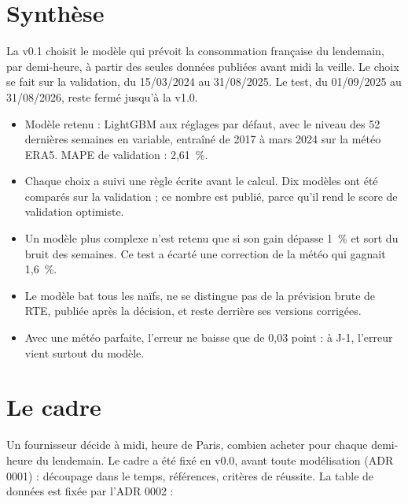 \documentclass[11pt,a4paper]{article}
\begin{document}

\setcounter{tocdepth}{1}
\tableofcontents
\newpage

\section*{Synthèse}

La v0.1 choisit le modèle qui prévoit la consommation française du lendemain, par demi-heure, à partir des seules données publiées avant midi la veille. Le choix se fait sur la validation, du 15/03/2024 au 31/08/2025. Le test, du 01/09/2025 au 31/08/2026, reste fermé jusqu'à la v1.0.

\begin{itemize}
  \item Modèle retenu : LightGBM aux réglages par défaut, avec le niveau des 52 dernières semaines en variable, entraîné de 2017 à mars 2024 sur la météo ERA5. MAPE de validation : 2,61~\%.
  \item Chaque choix a suivi une règle écrite avant le calcul. Dix modèles ont été comparés sur la validation ; ce nombre est publié, parce qu'il rend le score de validation optimiste.
  \item Un modèle plus complexe n'est retenu que si son gain dépasse 1~\% et sort du bruit des semaines. Ce test a écarté une correction de la météo qui gagnait 1,6~\%.
  \item Le modèle bat tous les naïfs, ne se distingue pas de la prévision brute de RTE, publiée après la décision, et reste derrière ses versions corrigées.
  \item Avec une météo parfaite, l'erreur ne baisse que de 0,03 point : à J-1, l'erreur vient surtout du modèle.
\end{itemize}


\section{Le cadre}

Un fournisseur décide à midi, heure de Paris, combien acheter pour chaque demi-heure du lendemain. Le cadre a été fixé en v0.0, avant toute modélisation (ADR 0001) : découpage dans le temps, références, critères de réussite. La table de données est fixée par l'ADR 0002 :
\end{document}
